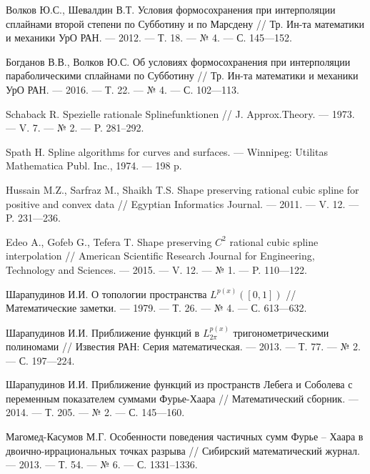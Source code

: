 \begin{thebibliography}{111}
Волков Ю.С., Шевалдин В.Т.
Условия формосохранения при интерполяции сплайнами второй степени по Субботину и по Марсдену
// Тр. Ин-та математики и механики УрО РАН. --- 2012. --- Т. 18. --- № 4. --- С. 145---152.



Богданов В.В., Волков Ю.С.
Об условиях формосохранения при интерполяции параболическими сплайнами по Субботину
// Тр. Ин-та математики и механики УрО РАН. --- 2016. --- Т. 22. --- № 4. --- С. 102---113.



Schaback R. Spezielle rationale Splinefunktionen
// J. Approx.Theory. --- 1973. --- V. 7. --- № 2. --- P. 281--292.



Spath H. Spline algorithms for curves and surfaces. --- Winnipeg: Utilitas Mathematica Publ. Inc., 1974. --- 198 p.



Hussain M.Z., Sarfraz M., Shaikh T.S.
Shape preserving rational cubic spline for positive and convex data
// Egyptian Informatics Journal. --- 2011. --- V. 12. --- P. 231---236.



Edeo A., Gofeb G., Tefera T. Shape preserving $C^2$ rational
 cubic spline interpolation // American Scientific Research Journal for Engineering, Technology and Sciences. ---
 2015. --- V. 12. --- № 1. --- P. 110---122.



Шарапудинов И.И. О топологии пространства
$ L^{p(x)}([0,1])$ // Математические заметки. --- 1979. --- Т. 26. --- № 4. --- С. 613---632.



Шарапудинов И.И. Приближение функций в $L^{p(x)}_{2\pi}$ тригонометрическими полиномами // Известия РАН: Серия математическая. --- 2013. --- Т. 77. --- № 2. --- С. 197---224.






Шарапудинов И.И. Приближение функций из пространств Лебега и Соболева с переменным показателем суммами Фурье-Хаара // Математический сборник. --- 2014. --- Т. 205. --- № 2. --- С. 145---160.



Магомед-Касумов М.Г. Особенности поведения частичных сумм Фурье -- Хаара в двоично-иррациональных точках разрыва // Сибирский математический журнал. --- 2013. --- Т. 54. --- № 6. --- С. 1331--1336.







\end{thebibliography}

